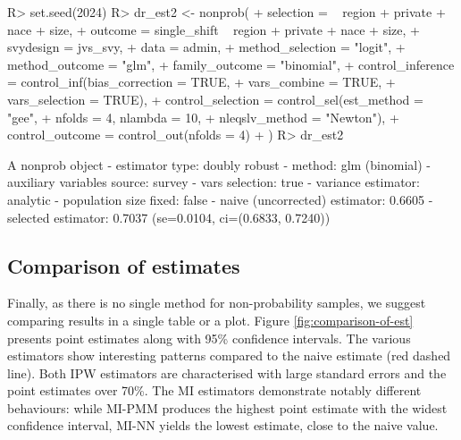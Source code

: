 \documentclass[
]{jss}
\begin{document}
\begin{CodeChunk}
\begin{CodeInput}
R> set.seed(2024)
R> dr_est2 <- nonprob(
+   selection = ~ region + private + nace + size,
+   outcome = single_shift ~ region + private + nace + size,
+   svydesign = jvs_svy,
+   data = admin,
+   method_selection = "logit",
+   method_outcome = "glm",
+   family_outcome = "binomial",
+   control_inference = control_inf(bias_correction = TRUE,
+                                   vars_combine = TRUE,
+                                   vars_selection = TRUE),
+   control_selection = control_sel(est_method = "gee",
+                                   nfolds = 4, nlambda = 10,
+                                   nleqslv_method = "Newton"),
+   control_outcome = control_out(nfolds = 4)
+ )
R> dr_est2
\end{CodeInput}
\begin{CodeOutput}
A nonprob object
 - estimator type: doubly robust
 - method: glm (binomial)
 - auxiliary variables source: survey
 - vars selection: true
 - variance estimator: analytic
 - population size fixed: false
 - naive (uncorrected) estimator: 0.6605
 - selected estimator: 0.7037 (se=0.0104, ci=(0.6833, 0.7240))
\end{CodeOutput}
\end{CodeChunk}

\subsection{Comparison of estimates}\label{comparison-of-estimates}

Finally, as there is no single method for non-probability samples, we
suggest comparing results in a single table or a plot. Figure
\ref{fig:comparison-of-est} presents point estimates along with 95\%
confidence intervals. The various estimators show interesting patterns
compared to the naive estimate (red dashed line). Both IPW estimators
are characterised with large standard errors and the point estimates
over 70\%. The MI estimators demonstrate notably different behaviours:
while MI-PMM produces the highest point estimate with the widest
confidence interval, MI-NN yields the lowest estimate, close to the
naive value.
\end{document}
